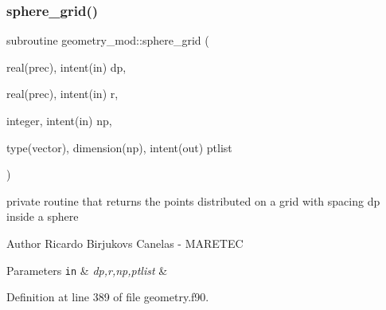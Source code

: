 \subsubsection{\texorpdfstring{sphere\+\_\+grid()}{sphere\_grid()}}
{\footnotesize\ttfamily subroutine geometry\+\_\+mod\+::sphere\+\_\+grid (\begin{DoxyParamCaption}\item[{real(prec), intent(in)}]{dp,  }\item[{real(prec), intent(in)}]{r,  }\item[{integer, intent(in)}]{np,  }\item[{type(vector), dimension(np), intent(out)}]{ptlist }\end{DoxyParamCaption})\hspace{0.3cm}{\ttfamily [private]}}



private routine that returns the points distributed on a grid with spacing dp inside a sphere 

\begin{DoxyAuthor}{Author}
Ricardo Birjukovs Canelas -\/ M\+A\+R\+E\+T\+EC 
\end{DoxyAuthor}

\begin{DoxyParams}[1]{Parameters}
\mbox{\tt in}  & {\em dp,r,np,ptlist} & \\
\hline
\end{DoxyParams}


Definition at line 389 of file geometry.\+f90.


